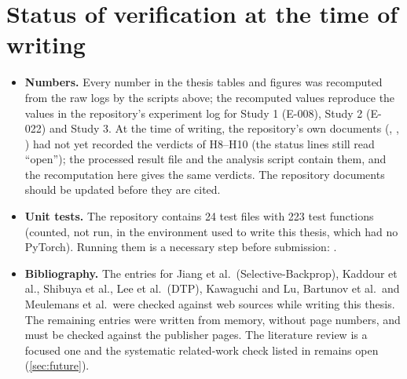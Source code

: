 \section{Status of verification at the time of writing}
\begin{itemize}
\item \textbf{Numbers.} Every number in the thesis tables and figures was recomputed from the raw logs by the scripts above; the recomputed values reproduce the values in the repository's experiment log for Study 1 (E-008), Study 2 (E-022) and Study 3. At the time of writing, the repository's own documents (, , ) had not yet recorded the verdicts of H8--H10 (the status lines still read ``open''); the processed result file  and the analysis script  contain them, and the recomputation here gives the same verdicts. The repository documents should be updated before they are cited.
\item \textbf{Unit tests.} The repository contains 24 test files with 223 test functions (counted, not run, in the environment used to write this thesis, which had no PyTorch). Running them is a necessary step before submission: .
\item \textbf{Bibliography.} The entries for Jiang et al.\ (Selective-Backprop), Kaddour et al., Shibuya et al., Lee et al.\ (DTP), Kawaguchi and Lu, Bartunov et al.\ and Meulemans et al.\ were checked against web sources while writing this thesis. The remaining entries were written from memory, without page numbers, and must be checked against the publisher pages. The literature review is a focused one and the systematic related-work check listed in  remains open (\cref{sec:future}).
\end{itemize}
